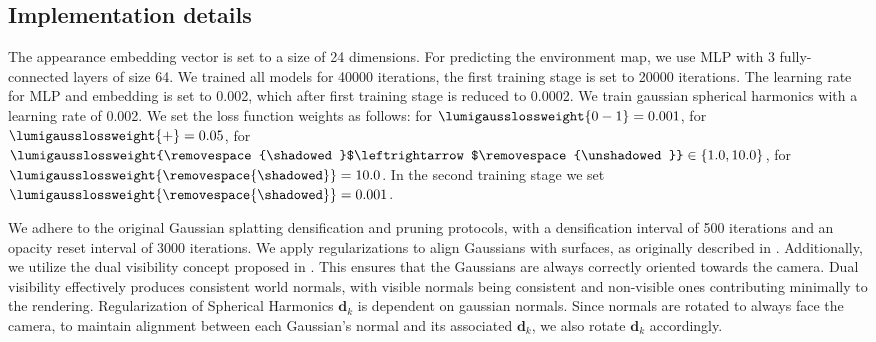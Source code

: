 

  \subsection{Implementation details}

    The appearance embedding vector is set to a size of 24 dimensions.
    For predicting the environment map, we use MLP with 3 fully-connected layers
    of size 64.
    We trained all models for 40000 iterations, the first training stage is set to
    20000 iterations.
    The learning rate for MLP and embedding is set to 0.002, which after first
    training stage is reduced to 0.0002.
    We train gaussian spherical harmonics with a learning rate of 0.002.
    We set the loss function weights as follows: for
    $\lumigausslossweight{0-1}=0.001$, for $\lumigausslossweight{+}=0.05$, for
    $\lumigausslossweight{\removespace{\shadowed}$\leftrightarrow$\removespace{\unshadowed}}
      \in \{1.0, 10.0\}$, for $\lumigausslossweight{\removespace{\shadowed}}=10.0$.
    In the second training stage we set
    $\lumigausslossweight{\removespace{\shadowed}}=0.001$.

    We adhere to the original Gaussian splatting densification and pruning
    protocols, with a densification interval of 500 iterations and an opacity
    reset interval of 3000 iterations.
    We apply regularizations to align Gaussians with surfaces, as originally
    described in \cite{huang20242d}.
    Additionally, we utilize the dual visibility concept proposed in
    \cite{huang20242d}.
    This ensures that the Gaussians are always correctly oriented towards the
    camera.
    Dual visibility effectively produces consistent world normals, with visible
    normals being consistent and non-visible ones contributing minimally to the
    rendering.
    Regularization of Spherical Harmonics $\mathbf{d}_{k}$ is dependent on
    gaussian normals.
    Since normals are rotated to always face the camera, to maintain alignment
    between each Gaussian's normal and its associated \( \mathbf{d}_k \), we also
    rotate \( \mathbf{d}_k \) accordingly.
